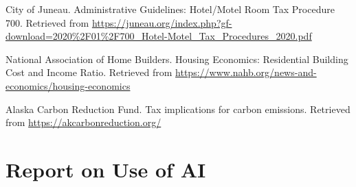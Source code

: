 \documentclass{mcmthesis}
\begin{document}
\begin{thebibliography}{99}
  City of Juneau. 
  Administrative Guidelines: Hotel/Motel Room Tax Procedure 700. 
  Retrieved from \url{https://juneau.org/index.php?gf-download=2020%2F01%2F700_Hotel-Motel_Tax_Procedures_2020.pdf}
  
  National Association of Home Builders. 
  Housing Economics: Residential Building Cost and Income Ratio. 
  Retrieved from \url{https://www.nahb.org/news-and-economics/housing-economics}
  
  Alaska Carbon Reduction Fund. 
  Tax implications for carbon emissions. 
  Retrieved from \url{https://akcarbonreduction.org/}
  \end{thebibliography}






% 


% 


\newpage
{}
\setcounter{lastpage}{\value{page}}
\thispagestyle{empty} 

\section*{Report on Use of AI}
\end{document}
